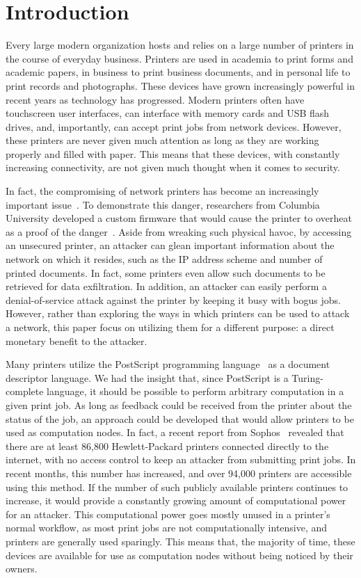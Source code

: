 \section{Introduction}

Every large modern organization hosts and relies on a large number of printers in the course of everyday business.
Printers are used in academia to print forms and academic papers, in business to print business documents, and in personal life to print records and photographs.
These devices have grown increasingly powerful in recent years as technology has progressed.
Modern printers often have touchscreen user interfaces, can interface with memory cards and USB flash drives, and, importantly, can accept print jobs from network devices.
However, these printers are never given much attention as long as they are working properly and filled with paper.
This means that these devices, with constantly increasing connectivity, are not given much thought when it comes to security.

In fact, the compromising of network printers has become an increasingly important issue~\cite{hacking_network_printers}.
To demonstrate this danger, researchers from Columbia University developed a custom firmware that would cause the printer to overheat as a proof of the danger~\cite{printer_fire}.
Aside from wreaking such physical havoc, by accessing an unsecured printer, an attacker can glean important information about the network on which it resides, such as the IP address scheme and number of printed documents.
In fact, some printers even allow such documents to be retrieved for data exfiltration.
In addition, an attacker can easily perform a denial-of-service attack against the printer by keeping it busy with bogus jobs.
However, rather than exploring the ways in which printers can be used to attack a network, this paper focus on utilizing them for a different purpose: a direct monetary benefit to the attacker.

Many printers utilize the PostScript programming language~\cite{postscript} as a document descriptor language.
We had the insight that, since PostScript is a Turing-complete language, it should be possible to perform arbitrary computation in a given print job.
As long as feedback could be received from the printer about the status of the job, an approach could be developed that would allow printers to be used as computation nodes.
In fact, a recent report from Sophos~\cite{internet_printers} revealed that there are at least 86,800 Hewlett-Packard printers connected directly to the internet, with no access control to keep an attacker from submitting print jobs.
In recent months, this number has increased, and over 94,000 printers are accessible using this method.
If the number of such publicly available printers continues to increase, it would provide a constantly growing amount of computational power for an attacker.
This computational power goes mostly unused in a printer's normal workflow, as most print jobs are not computationally intensive, and printers are generally used sparingly.
This means that, the majority of time, these devices are available for use as computation nodes without being noticed by their owners.

